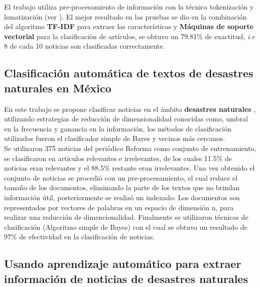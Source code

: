 El trabajo utiliza  pre-procesamiento de información con la técnica tokenización y lematización (ver ). El mejor resultado en las pruebas se dio en la combinación del algoritmo \textbf{TF-IDF} para extraer las características y \textbf{Máquinas de soporte vectorial} para la clasificación de artículos, se obtuvo un 79.81\% de exactitud, \textit{i.e} 8 de cada 10 noticias son clasificadas correctamente.\\



\begin{large}
	 \subsection[Desastres naturales en México]{Clasificación automática de textos de desastres naturales en México}
\end{large}

En este trabajo se propone clasificar noticias en el ámbito \textbf{desastres naturales} \citep{CD9}, utilizando estrategias de reducción de dimensionalidad conocidas como, umbral en la frecuencia y ganancia en la información, los métodos de clasificación utilizados fueron el clasificador simple de Bayes y vecinos más cercanos.\\

Se utilizaron 375 noticias del periódico Reforma como conjunto de entrenamiento, se clasificaron en artículos relevantes e irrelevantes, de los cuales 11.5\% de noticias eran relevantes y el 88.5\% restante eran irrelevantes. Una vez obtenido el conjunto de noticias se procedió con un pre-procesamiento, el cual reduce el tamaño de los documentos, eliminando la parte de los textos que no brindan información útil, posteriormente se realizó un indexado: Los documentos son representados por vectores de palabras en un espacio de dimensión n, para realizar una reducción de dimencionalidad. Finalmente se utilizaron técnicas de clasificación (Algoritmo simple de Bayes) con el cual se obtuvo un resultado de 97\% de efectividad en la clasificación de noticias.\\



\begin{large}
	 \subsection[Extraer noticias de desastres naturales]{Usando aprendizaje automático para extraer información de noticias de desastres naturales}
\end{large}


